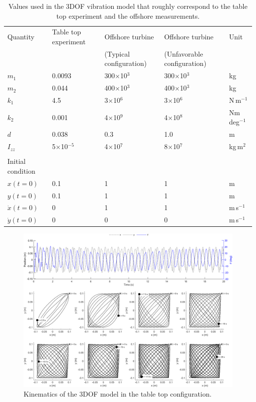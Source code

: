 \documentclass{article}
\begin{document}
\begin{table}[]
    \centering
    \begin{tabular}{l l l ll }
    \toprule
         Quantity & Table top experiment & Offshore turbine &  Offshore turbine & Unit \\
         & & (Typical configuration) & (Unfavorable configuration)\\
         \midrule
         $m_1$ & 0.0093 & 300$\times$10$^3$ & 300$\times$10$^3$ & kg\\ 
         $m_2$ & 0.044 & 400$\times$10$^3$ & 400$\times$10$^3$ & kg\\ 
         $k_1$ & 4.5 & 3$\times$10$^6$ & 3$\times$10$^6$ & N\,m$^{-1}$ \\ 
         $k_2$ & 0.001 & 4$\times$10$^9$ & 4$\times$10$^8$ & Nm\,deg$^{-1}$ \\ 
         $d$ & 0.038 & 0.3 & 1.0 & m\\ 
         $I_{zz}$ & 5$\times$10$^{-5}$ & 4$\times$10$^7$ & 8$\times$10$^7$ & kg\,m$^2$ \\
         \\
         Initial condition & \\
         \midrule
         $x(t=0)$ & 0.1 & 1 & 1 & m\\ 
         $y(t=0)$ & 0.1 & 1 & 1 & m\\
         $\dot{x}(t=0)$ & 0 & 1 & 1 & m\,s$^{-1}$ \\
         $\dot{y}(t=0)$ & 0 & 0 & 0 & m\,s$^{-1}$ \\
         \bottomrule
    \end{tabular}
    \caption{Values used in the 3DOF vibration model that roughly correspond to the table top experiment and the offshore measurements.}
    \label{tab:3dof-variable-values}
\end{table}

\begin{figure}
    \centering
    \includegraphics[width=1\textwidth]{figures/tabletop.png}
    \caption{Kinematics of the 3DOF model in the table top configuration.}
    \label{fig:3dof-tabletop}
\end{figure}
\end{document}
